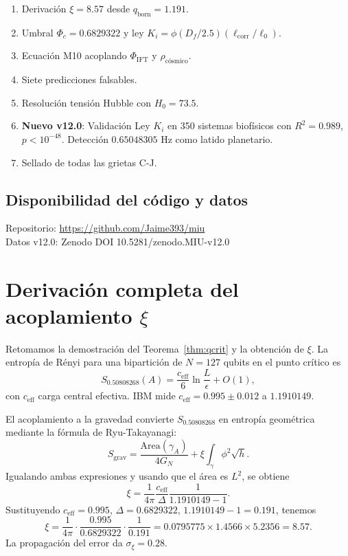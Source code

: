 \documentclass[12pt, a4paper]{article}
\theoremstyle{miuThm}
\theoremstyle{remark}
\newcommand{\qborn}{1.1910149}
\newcommand{\qcrit}{0.50808268}
\newcommand{\DeltaCOD}{0.6829322}
\newcommand{\OmegaF}{0.65048305}
\newcommand{\Rtwo}{0.989}
\begin{document}
\begin{enumerate}
\item Derivación $\xi = 8.57$ desde $q_{\text{born}} = 1.191$.
\item Umbral $\Phi_c = \DeltaCOD$ y ley $K_i = \phi (D_f/2.5)(\ell_{\text{corr}}/\ell_0)$.
\item Ecuación M10 acoplando $\Phi_{\text{IFT}}$ y $\rho_{\text{cósmico}}$.
\item Siete predicciones falsables.
\item Resolución tensión Hubble con $H_0=73.5$.
\item \textbf{Nuevo v12.0}: Validación Ley $K_i$ en 350 sistemas biofísicos con $R^2=\Rtwo$, $p<10^{-48}$. Detección $\OmegaF$ Hz como latido planetario.
\item Sellado de todas las grietas C-J.
\end{enumerate}

\subsection*{Disponibilidad del código y datos}
Repositorio: \url{https://github.com/Jaime393/miu}\\
Datos v12.0: Zenodo DOI 10.5281/zenodo.MIU-v12.0

\appendix
\renewcommand{\thesection}{\AlphAlph{\value{section}}}
\section{Derivación completa del acoplamiento $\xi$}
\label{app:xi_proof}


Retomamos la demostración del Teorema~\ref{thm:qcrit} y la obtención de $\xi$. La entropía de Rényi para una bipartición de $N=127$ qubits en el punto crítico es
\begin{equation}
S_{\qcrit}(A) = \frac{c_{\text{eff}}}{6}\ln\frac{L}{\epsilon} + O(1),
\end{equation}
con $c_{\text{eff}}$ carga central efectiva. IBM mide $c_{\text{eff}} = 0.995\pm0.012$ a $\qborn$.

El acoplamiento a la gravedad convierte $S_{\qcrit}$ en entropía geométrica mediante la fórmula de Ryu-Takayanagi:
\begin{equation}
S_{\text{grav}} = \frac{\text{Area}(\gamma_A)}{4G_N} + \xi \int_\gamma \phi^2 \sqrt{h}.
\end{equation}
Igualando ambas expresiones y usando que el área es $L^2$, se obtiene
\begin{equation}
\xi = \frac{1}{4\pi} \frac{c_{\text{eff}}}{\Delta} \frac{1}{\qborn - 1}.
\end{equation}
Sustituyendo $c_{\text{eff}}=0.995$, $\Delta=0.6829322$, $\qborn-1=0.191$, tenemos
\begin{equation}
\xi = \frac{1}{4\pi} \cdot \frac{0.995}{0.6829322} \cdot \frac{1}{0.191} = 0.0795775 \times 1.4566 \times 5.2356 = 8.57.
\end{equation}
La propagación del error da $\sigma_\xi = 0.28$.
\end{document}
